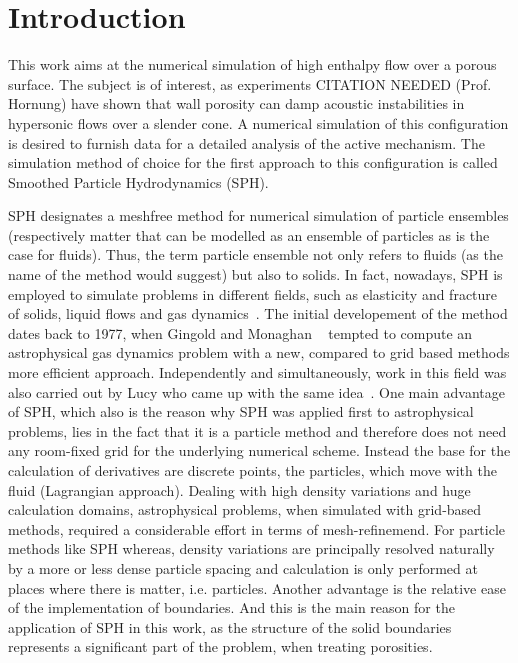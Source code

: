 \documentclass{report}
\begin{document}
%



\tableofcontents
\chapter{Introduction}
\label{sec:intro}


This work aims at the numerical simulation of high enthalpy flow over a porous
surface. The subject is of interest, as experiments CITATION
NEEDED (Prof. Hornung) have shown that wall porosity can damp
acoustic instabilities in hypersonic flows over a slender cone. A numerical
simulation of this configuration is desired to furnish data for a detailed
analysis of the active mechanism. The simulation method of choice for the first approach
to this configuration is called Smoothed Particle Hydrodynamics (SPH). 

SPH designates a meshfree method for numerical simulation of particle
ensembles (respectively matter that can be modelled as an ensemble of
particles as is the case for fluids).
Thus, the term particle ensemble not only refers
to fluids (as the name of the method would suggest) but also to solids. In
fact, nowadays, SPH is employed to simulate problems in different fields,
such as elasticity and fracture of solids, liquid flows and gas
dynamics~\cite{Monaghan2005}.
The initial developement of the method dates back to 1977, when Gingold and
Monaghan ~\cite{Gingold1977} tempted to compute an astrophysical gas dynamics problem with a new, compared to grid based methods more efficient approach. Independently and simultaneously, work in this field was also carried out by Lucy who came up with the same idea~\cite{Lucy1977}. One main advantage of SPH, which also is the reason why SPH was applied first to astrophysical problems, lies in the fact that it is a particle method and therefore does not need any room-fixed grid for the underlying numerical scheme. Instead
the base for the calculation of derivatives are discrete points, the particles, which move with the fluid (Lagrangian approach). Dealing with high density variations and huge calculation domains, astrophysical problems, when simulated with grid-based methods, 
required a considerable effort in terms of mesh-refinemend. For particle methods like SPH whereas, density variations are principally resolved naturally by a more or less dense particle spacing and calculation is only performed at places where there is matter, i.e. particles.
Another advantage is the relative ease of the
implementation of boundaries. And this is the main reason for the application of SPH in this work, as the structure of the solid boundaries represents a significant part of the problem, when treating porosities. 
 
\end{document}
